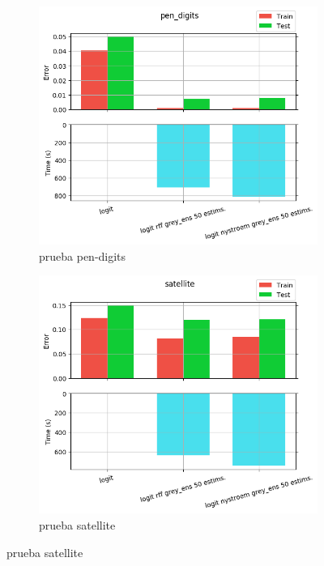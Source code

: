 \begin{figure}[ht]
  \centering
  \begin{subfigure}[b]{0.5\linewidth}
    \centering\captionsetup{width=.8\linewidth}\includegraphics[width=\imgscale\linewidth]{Figures/2_4/pen_digits}
    \caption{prueba pen-digits}
    \label{fig:2_4_pen_digits}
  \end{subfigure}%
  \begin{subfigure}[b]{0.5\linewidth}
    \centering\captionsetup{width=.8\linewidth}\includegraphics[width=\imgscale\linewidth]{Figures/2_4/satellite}
    \caption{prueba satellite}
    \label{fig:2_4_satellite}
  \end{subfigure}
\end{figure}

